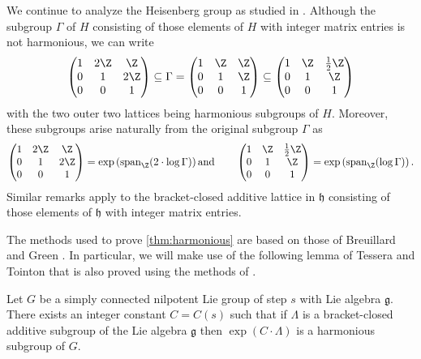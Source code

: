 \begin{example}
We continue to analyze the Heisenberg group as studied in . Although the subgroup $\Gamma$ of $H$ consisting of those elements of $H$ with integer matrix entries is not harmonious, we can write
\[
  \left(\begin{matrix} 1 & 2\Z & \Z \\ 0 & 1 & 2\Z \\ 0&0&1\end{matrix}\right) \subseteq \Gamma = \left(\begin{matrix} 1 & \Z & \Z \\ 0 & 1 & \Z \\ 0&0&1\end{matrix}\right) \subseteq \left(\begin{matrix} 1 & \Z & \frac{1}{2}\Z \\ 0 & 1 & \Z \\ 0&0&1\end{matrix}\right)
\]
with the two outer two lattices being harmonious subgroups of $H$. Moreover, these subgroups arise naturally from the original subgroup $\Gamma$ as
\begin{align*}
\left(\begin{matrix} 1 & 2\Z & \Z \\ 0 & 1 & 2\Z \\ 0&0&1\end{matrix}\right) = \exp\left(\operatorname{span}_\Z (2\cdot \log \Gamma) \right)
\text{and}\qquad 
\left(\begin{matrix} 1 & \Z & \frac{1}{2}\Z \\ 0 & 1 & \Z \\ 0&0&1\end{matrix}\right) = \exp\left(\operatorname{span}_\Z (\log \Gamma)\right).
\end{align*}
Similar remarks apply to the bracket-closed additive lattice in $\mathfrak{h}$ consisting of those elements of $\mathfrak{h}$ with integer matrix entries.
\end{example}

The methods used to prove \cref{thm:harmonious} are based on those of Breuillard and Green \cite{breuillard2011approximate}. In particular, we will make use of the following lemma of Tessera and Tointon \cite{MR3877012} that is also proved using the methods of \cite{breuillard2011approximate}.


\begin{lemma}
\label{lem:additive_to_harmonious}
Let $G$ be a simply connected nilpotent Lie group of step $s$ with Lie algebra $\mathfrak{g}$. There exists an integer constant $C=C(s)$ such that if $\Lambda$ is a bracket-closed additive subgroup of the Lie algebra $\mathfrak{g}$ then $\exp ( C \cdot \Lambda)$ is a harmonious subgroup of $G$.
\end{lemma}

